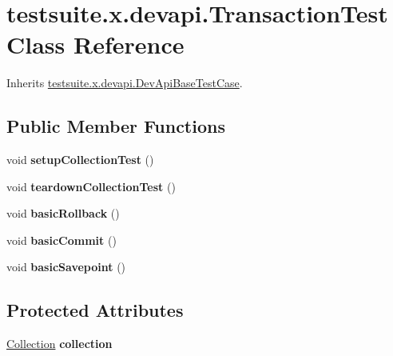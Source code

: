 \hypertarget{classtestsuite_1_1x_1_1devapi_1_1_transaction_test}{}\section{testsuite.\+x.\+devapi.\+Transaction\+Test Class Reference}
\label{classtestsuite_1_1x_1_1devapi_1_1_transaction_test}


Inherits \mbox{\hyperlink{classtestsuite_1_1x_1_1devapi_1_1_dev_api_base_test_case}{testsuite.\+x.\+devapi.\+Dev\+Api\+Base\+Test\+Case}}.

\subsection*{Public Member Functions}
\begin{DoxyCompactItemize}
\item 
\mbox{\label{classtestsuite_1_1x_1_1devapi_1_1_transaction_test_ada3dbd82588094abecb9890ff359e651}} 
void {\bfseries setup\+Collection\+Test} ()
\item 
\mbox{\label{classtestsuite_1_1x_1_1devapi_1_1_transaction_test_a822e4978fef487a56693c92b5a01813c}} 
void {\bfseries teardown\+Collection\+Test} ()
\item 
\mbox{\label{classtestsuite_1_1x_1_1devapi_1_1_transaction_test_a3cf4d848d7fb3d3017c7b9b264c619e2}} 
void {\bfseries basic\+Rollback} ()
\item 
\mbox{\label{classtestsuite_1_1x_1_1devapi_1_1_transaction_test_a08d92138bc30ce02d654a7b5745bf6bd}} 
void {\bfseries basic\+Commit} ()
\item 
\mbox{\label{classtestsuite_1_1x_1_1devapi_1_1_transaction_test_a45c0eafdd6f0521793c4fe94b0dcc495}} 
void {\bfseries basic\+Savepoint} ()
\end{DoxyCompactItemize}
\subsection*{Protected Attributes}
\begin{DoxyCompactItemize}
\item 
\mbox{\label{classtestsuite_1_1x_1_1devapi_1_1_transaction_test_a0d7538a90a1ac03709e7a3f2efb25968}} 
\mbox{\hyperlink{interfacecom_1_1mysql_1_1cj_1_1xdevapi_1_1_collection}{Collection}} {\bfseries collection}
\end{DoxyCompactItemize}
